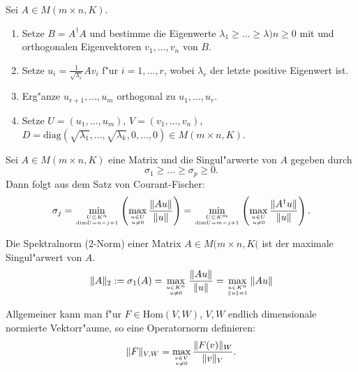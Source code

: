 \documentclass[8pt, a4paper, twocolumn, landscape]{article}
\begin{document}
{%
\begin{remark} 
Sei $A \in M(m \times n, K)$.
\begin{enumerate}
\item Setze $B = A^\dagger A$ und bestimme die Eigenwerte $\lambda_1 \geq ... \geq \lambda)n \geq 0$ mit und orthogonalen Eigenvektoren $v_1, ..., v_n$ von $B$.
\item Setze $u_i = \frac{1}{\sqrt{\lambda_i}} A v_i$ f"ur $i = 1, ..., r$, wobei $\lambda_r$ der letzte positive Eigenwert ist.
\item Erg"anze $u_{r+1}, ..., u_m$ orthogonal zu $u_1, ..., u_r$.
\item Setze $U = (u_1, ..., u_m)$, $V = (v_1, ..., v_n)$, $D = \mathrm{diag}(\sqrt{\lambda_1}, ..., \sqrt{\lambda_k}, 0, ..., 0) \in M(m \times n, K)$.
\end{enumerate}
\end{remark}


\begin{corollary}
Sei $A \in M(m \times n, K)$ eine Matrix und die Singul"arwerte von $A$ gegeben durch
$$
\sigma_1 \geq ... \geq \sigma_p \geq 0.
$$
Dann folgt aus dem Satz von Courant-Fischer:
$$
\sigma_j = \min\limits_{U \subset K^n \atop \mathrm{dim}U = n-j+1} \left(   \max\limits_{u \in U \atop u \neq 0} \frac{\|Au\|}{\|u\|}\right) = \min\limits_{U \subset K^m \atop \mathrm{dim} U = m - j + 1} \left(   \max\limits_{ u \in U \atop u \neq 0 } \frac{ \|A^\dagger u\| }{ \|u\| } \right).
$$
\end{corollary}


\begin{definition}
Die Spektralnorm (2-Norm) einer Matrix $A \in M(m \times n, K($ ist der maximale Singul"arwert von $A$.
$$
\|A\|_{2}:=\sigma_{1}(A)=\max _{u \in K^n \atop u \neq 0} \frac{\|A u\|}{\|u\|}=\max _{u \in K^n \atop \|u\|=1}\|A u\|
$$
\end{definition}

\begin{remark}
Allgemeiner kann man f"ur $F \in \mathrm{Hom}(V, W)$, $V, W$ endlich dimensionale normierte Vektorr"aume, so eine Operatornorm definieren:
$$
\|F\|_{V, W} = \max\limits_{ v \in V \atop v \neq 0} \frac{\|F(v)\|_W}{\|v\|_V}.
$$
\end{remark}


}
\end{document}

